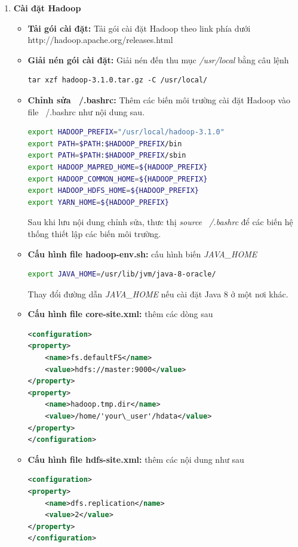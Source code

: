 \begin{enumerate}
\begin{itemize}
			\end{itemize}
			\item \textbf{Cài đặt Hadoop}
			\begin{itemize}
				\item \textbf{Tải gói cài đặt: }Tải gói cài đặt Hadoop theo link phía dưới\\
				http://hadoop.apache.org/releases.html
				\item \textbf{Giải nén gói cài đặt: }Giải nén đến thu mục \textit{/usr/local} bằng câu lệnh
				\begin{lstlisting}
tar xzf hadoop-3.1.0.tar.gz -C /usr/local/
				\end{lstlisting}
				\item \textbf{Chỉnh sửa ~/.bashrc: }Thêm các biến môi trường cài đặt Hadoop vào file ~/.bashrc như nội dung sau.
				\pagebreak
				\begin{lstlisting}[language=bash]
export HADOOP_PREFIX="/usr/local/hadoop-3.1.0"
export PATH=$PATH:$HADOOP_PREFIX/bin
export PATH=$PATH:$HADOOP_PREFIX/sbin
export HADOOP_MAPRED_HOME=${HADOOP_PREFIX}
export HADOOP_COMMON_HOME=${HADOOP_PREFIX}
export HADOOP_HDFS_HOME=${HADOOP_PREFIX}
export YARN_HOME=${HADOOP_PREFIX}
				\end{lstlisting}
				Sau khi lưu nội dung chỉnh sửa, thưc thị \textit{source ~/.bashrc} để các biến hệ thống thiết lập các biến môi trường.
				\item \textbf{Cấu hình file hadoop-env.sh: }cấu hình biến \textit{JAVA\_HOME}
				\begin{lstlisting}[language=bash]
export JAVA_HOME=/usr/lib/jvm/java-8-oracle/
				\end{lstlisting}
				Thay đổi đường dẫn \textit{JAVA\_HOME} nếu cài đặt Java 8 ở một nơi khác.
				\item \textbf{Cấu hình file core-site.xml: }thêm các dòng sau
				\begin{lstlisting}[language=XML]
<configuration>
<property>
	<name>fs.defaultFS</name>
	<value>hdfs://master:9000</value>
</property>
<property>
	<name>hadoop.tmp.dir</name>
	<value>/home/'your\_user'/hdata</value>
</property>
</configuration>
				\end{lstlisting}
				\item \textbf{Cấu hình file hdfs-site.xml: }thêm các nội dung như sau
				\begin{lstlisting}[language=XML]
<configuration>
<property>
	<name>dfs.replication</name>
	<value>2</value>
</property>
</configuration>
				\end{lstlisting}

\end{itemize}
\end{enumerate}
